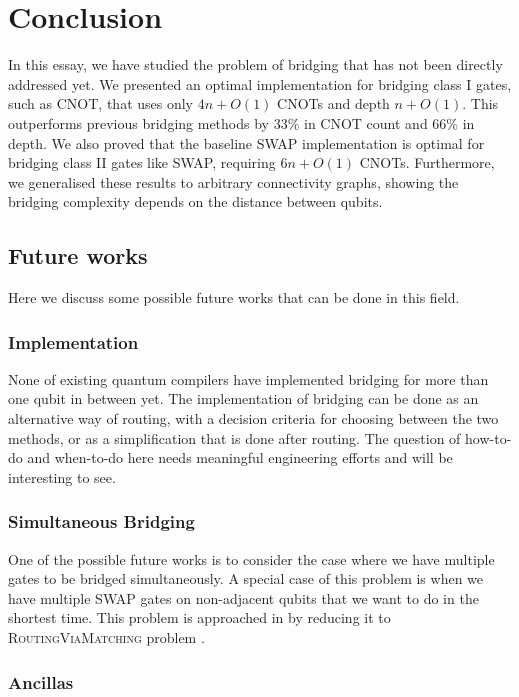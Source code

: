 \chapter{Conclusion}\label{chap:conclusion}

In this essay, we have studied the problem of bridging that has not been directly addressed yet. We presented an optimal implementation for bridging class I gates, such as CNOT, that uses only $4n+O(1)$ CNOTs and depth $n+O(1)$. This outperforms previous bridging methods by $33\%$ in CNOT count and $66\%$ in depth. We also proved that the baseline SWAP implementation is optimal for bridging class II gates like SWAP, requiring $6n+O(1)$ CNOTs. Furthermore, we generalised these results to arbitrary connectivity graphs, showing the bridging complexity depends on the distance between qubits.

\section{Future works}

Here we discuss some possible future works that can be done in this field.

\subsection{Implementation}

None of existing quantum compilers have implemented bridging for more than one qubit in between yet. The implementation of bridging can be done as an alternative way of routing, with a decision criteria for choosing between the two methods, or as a simplification that is done after routing. The question of how-to-do and when-to-do here needs meaningful engineering efforts and will be interesting to see.

\subsection{Simultaneous Bridging}

One of the possible future works is to consider the case where we have multiple gates to be bridged simultaneously. A special case of this problem is when we have multiple SWAP gates on non-adjacent qubits that we want to do in the shortest time. This problem is approached in \cite{childs} by reducing it to \textsc{RoutingViaMatching} problem \cite{banerjee2017}. 

\subsection{Ancillas}

